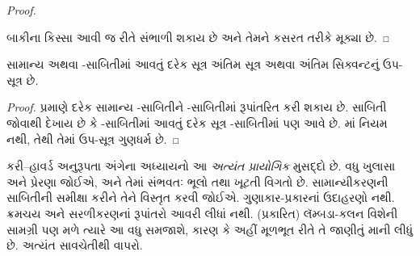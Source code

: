\begin{proof}
\begin{enumerate}
\end{enumerate}
બાકીના કિસ્સા
આવી જ રીતે
સંભાળી શકાય
છે અને તેમને
કસરત તરીકે
મૂક્યા છે.
\end{proof}

\begin{cor}
સામાન્ય
 અથવા
-સાબિતીમાં
આવતું દરેક
સૂત્ર
અંતિમ
સૂત્ર અથવા
અંતિમ સિક્વન્ટનું
ઉપ-સૂત્ર
છે.
\end{cor}

\begin{proof}
  પ્રમાણે દરેક
  સામાન્ય
  -સાબિતીને
  -સાબિતીમાં
  રૂપાંતરિત કરી
  શકાય છે.
  સાબિતી જોવાથી
  દેખાય છે કે
  -સાબિતીમાં
  આવતું દરેક
  સૂત્ર
  -સાબિતીમાં
  પણ આવે છે.
  માં
  \Cut{} નિયમ
  નથી, તેથી
  તેમાં
  ઉપ-સૂત્ર
  ગુણધર્મ છે.
\end{proof}
\endgroup


\OLEndChapterHook
\endgroup

\begingroup
\makeatletter{}\makeatother

\label{guunit:OLP-0690}


\begin{editorial}
  કરી--હાવર્ડ અનુરૂપતા અંગેના અધ્યાયનો આ
  \emph{અત્યંત પ્રાયોગિક} મુસદ્દો છે.
  વધુ ખુલાસા અને પ્રેરણા જોઈએ, અને તેમાં
  સંભવતઃ ભૂલો તથા ખૂટતી વિગતો છે.
  સામાન્યીકરણની સાબિતીની સમીક્ષા કરીને
  તેને વિસ્તૃત કરવી જોઈએ. ગુણાકાર-પ્રકારનાં
  ઉદાહરણો નથી. ક્રમચય અને સરળીકરણનાં
  રૂપાંતરો આવરી લીધાં નથી. (પ્રકારિત)
  લૅમ્બડા-કલન વિશેની સામગ્રી પણ મળે
  ત્યારે આ વધુ સમજાશે, કારણ કે અહીં
  મૂળભૂત રીતે તે જાણીતું માની લીધું છે.
  અત્યંત સાવચેતીથી વાપરો.
\end{editorial}

\begingroup
\makeatletter{}\makeatother


\label{guunit:OLP-0686}


